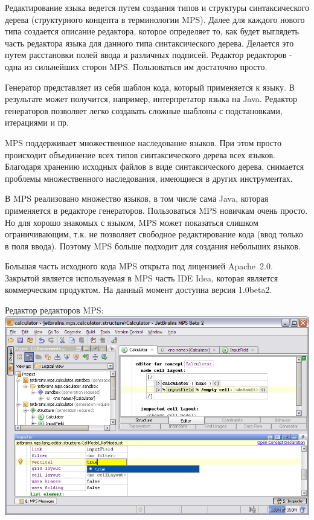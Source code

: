 \documentclass[a4paper,12pt,titlepage]{extarticle}
\begin{document}
Редактирование языка ведется путем создания типов и структуры синтаксического
дерева (структурного концепта в терминологии MPS). Далее для каждого нового типа
создается описание редактора, которое определяет то, как будет выглядеть часть
редактора языка для данного типа синтаксического дерева. Делается это путем
расстановки полей ввода и различных подписей. Редактор редакторов - одна из
сильнейших сторон MPS. Пользоваться им достаточно просто.

Генератор представляет из себя шаблон кода, который применяется к языку. В
результате может получится, например, интерпретатор языка на Java. Редактор
генераторов позволяет легко создавать сложные шаблоны с подстановками,
итерациями и пр.

MPS поддерживает множественное наследование языков. При этом просто происходит 
объединение всех типов синтаксического дерева всех языков. Благодаря хранению
исходных файлов в виде синтаксического дерева, снимается проблемы
множественного наследования, имеющиеся в других инструментах.

В MPS реализовано множество языков, в том числе сама Java, которая применяется
в редакторе генераторов. Пользоваться MPS новичкам очень просто. Но для хорошо
знакомых с языком, MPS может показаться слишком ограничивающим, т.к. не позволяет
свободное редактирование кода (ввод только в поля ввода). Поэтому MPS больше
подходит для создания небольших языков.

Большая часть исходного кода MPS открыта под лицензией Apache~2.0. Закрытой
является используемая в MPS часть IDE Idea, которая является коммерческим
продуктом.
На данный момент доступна версия 1.0beta2.

\begin{center}
Редактор редакторов MPS:
\includegraphics[scale=0.4]{img/mps.png}
\end{center}
\end{document}
